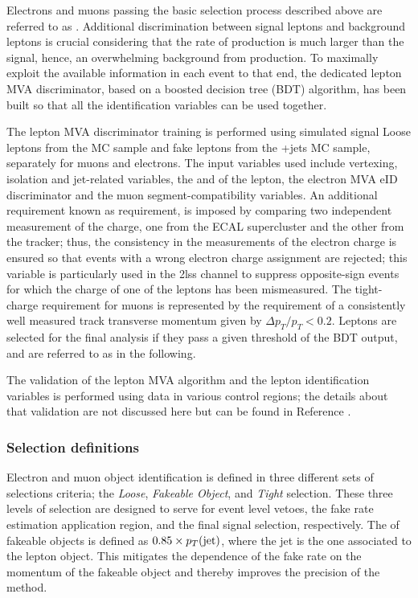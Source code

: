 Electrons and muons passing the basic selection process described above are referred to as . Additional discrimination between signal leptons and background leptons is crucial considering that the rate of \ttbar production is much larger than the signal, hence, an overwhelming background from \ttbar production. To maximally exploit the available information in each event to that end, the dedicated lepton MVA discriminator, based on a boosted decision tree (BDT) algorithm, has been built so that all the identification variables can be used together.

The lepton MVA discriminator training is performed using simulated signal Loose leptons from the \ttH MC sample and fake leptons from the \ttbar+jets MC sample, separately for muons and electrons. The input variables used include vertexing, isolation and jet-related variables, the \pt and \etac of the lepton, the electron MVA eID discriminator and the muon segment-compatibility variables. An additional requirement known as  requirement, is imposed by comparing two independent measurement of the charge, one from the ECAL supercluster and the other from the tracker; thus, the consistency in the measurements of the electron charge is ensured so that events with a wrong electron charge assignment are rejected; this variable is particularly used in the 2lss channel to suppress opposite-sign events for which the charge of one of the leptons has been mismeasured. The tight-charge requirement for muons is represented by the requirement of a consistently well measured track transverse momentum given by $\Delta p_T/p_T < 0.2$.          
Leptons are selected for the final analysis if they pass a given threshold of the BDT output, and are referred to as  in the following.          

The validation of the lepton MVA algorithm and the lepton identification variables is performed using data in various control regions; the details about that validation are not discussed here but can be found in Reference \cite{CMS_AN_2017-029}. 

\subsubsection*{Selection definitions}

Electron and muon object identification is defined in three different sets of selections criteria; the \emph{Loose}, \emph{Fakeable Object}, and \emph{Tight} selection. These three levels of selection are designed to serve for event level vetoes, the fake rate estimation application region, and the final signal selection, respectively. The \pt of fakeable objects is defined as $0.85\times p_T(\mathrm{jet})$, where the jet is the one associated to the lepton object. This mitigates the dependence of the fake rate on the momentum of the fakeable object and thereby improves the precision of the method. 


